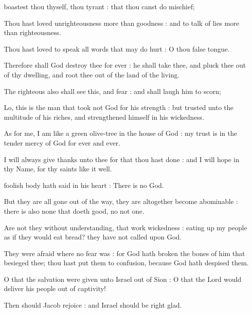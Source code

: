 
 boastest thou thyself, thou tyrant : that thou canst do mischief;\par
{}
Thou hast loved unrighteousness more than goodness : and to talk of lies more than righteousness.\par
{}Thou hast loved to speak all words that may do hurt : O thou false tongue.\par
{}Therefore shall God destroy thee for ever : he shall take thee, and pluck thee out of thy dwelling, and root thee out of the land of the living.\par
{}The righteous also shall see this, and fear : and shall laugh him to scorn;\par
{}Lo, this is the man that took not God for his strength : but trusted unto the multitude of his riches, and strengthened himself in his wickedness.\par
{}As for me, I am like a green olive-tree in the house of God : my trust is in the tender mercy of God for ever and ever.\par
{}I will always give thanks unto thee for that thou hast done : and I will hope in thy Name, for thy saints like it well.\par



 foolish body hath said in his heart : There is no God.\par
{}
But they are all gone out of the way, they are altogether become abominable : there is also none that doeth good, no not one.\par
{}Are not they without understanding, that work wickedness : eating up my people as if they would eat bread? they have not called upon God.\par
{}They were afraid where no fear was : for God hath broken the bones of him that besieged thee; thou hast put them to confusion, because God hath despised them.\par
{}O that the salvation were given unto Israel out of Sion : O that the Lord would deliver his people out of captivity!\par
{}Then should Jacob rejoice : and Israel should be right glad.\par

